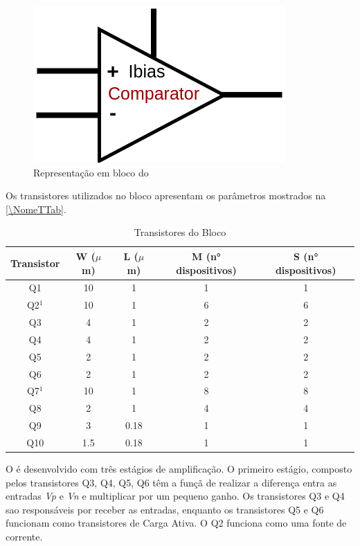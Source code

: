 \begin{figure}[htb]
 \centering
    \centering
    \caption{Representa{\c c}\~ao em bloco do \NomeBloco} \label{\NomeSFig}
    \includegraphics[scale=0.3]{Circuitos/Comparator_block.png}
\end{figure}

Os transistores utilizados no bloco \NomeBloco{} apresentam os par\^ametros mostrados na \autoref{\NomeTTab}.

\begin{table}[htbp]
\caption{Transistores do Bloco \NomeBloco}
\label{\NomeTTab}
\centering
\begin{tabular}{ccccc}
\toprule
Transistor & W ($\mu$m)  & L ($\mu$m)           & M (n° dispositivos) & S (n° dispositivos)\\
\midrule \midrule
Q1 & 10 & 1 & 1 & 1\\
\midrule
Q2$^1$ & 10 & 1 & 6 & 6\\
\midrule
Q3 & 4 & 1 & 2 & 2\\
\midrule
Q4 & 4 & 1 & 2 & 2\\
\midrule
Q5 & 2 & 1 & 2 & 2\\
\midrule
Q6 & 2 & 1 & 2 & 2\\
\midrule
Q7$^1$ & 10 & 1 & 8 & 8\\
\midrule
Q8 & 2 & 1 & 4 & 4\\
\midrule
Q9 & 3 & 0.18 & 1 & 1\\
\midrule
Q10 & 1.5 & 0.18 & 1 & 1\\

\bottomrule
\end{tabular}
\end{table}
 
O \NomeBloco{} \'e desenvolvido com tr\^es est\'agios de amplifica{\c c}\~ao. O primeiro est\'agio, composto pelos transistores Q3, Q4, Q5, Q6 t\^em a fun{\c c}\~a de realizar a diferen{\c c}a entra as entradas \emph{Vp} e \emph{Vn} e multiplicar por um pequeno ganho. Os transistores Q3 e Q4 sao respons\'aveis por receber as entradas, enquanto os transistores Q5 e Q6 funcionam como transistores de Carga Ativa. O Q2 funciona como uma fonte de corrente.

